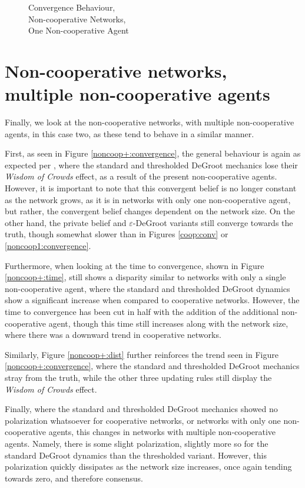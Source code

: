 \documentclass[a4paper, 12pt]{report}
\begin{document}
\begin{figure}[!htbp]
    \caption{Convergence Behaviour, \\ Non-cooperative Networks, \\ One Non-cooperative Agent}
\end{figure}

\newpage

\section{Non-cooperative networks, \\ multiple non-cooperative agents}
\label{results:noncoop+}
Finally, we look at the non-cooperative networks, with multiple non-cooperative agents, in this case two, as these tend to behave in a similar manner.

First, as seen in Figure \ref{noncoop+:convergence}, the general behaviour is again as expected per \cite{amir2021robust}, where the standard and thresholded DeGroot mechanics lose their \emph{Wisdom of Crowds} effect, as a result of the present non-cooperative agents. However, it is important to note that this convergent belief is no longer constant as the network grows, as it is in networks with only one non-cooperative agent, but rather, the convergent belief changes dependent on the network size. On the other hand, the private belief and $\varepsilon$-DeGroot variants still converge towards the truth, though somewhat slower than in Figures \ref{coop:conv} or \ref{noncoop1:convergence}.

Furthermore, when looking at the time to convergence, shown in Figure \ref{noncoop+:time}, still shows a disparity similar to networks with only a single non-cooperative agent, where the standard and thresholded DeGroot dynamics show a significant increase when compared to cooperative networks. However, the time to convergence has been cut in half with the addition of the additional non-cooperative agent, though this time still increases along with the network size, where there was a downward trend in cooperative networks.

Similarly, Figure \ref{noncoop+:dist} further reinforces the trend seen in Figure \ref{noncoop+:convergence}, where the standard and thresholded DeGroot mechanics stray from the truth, while the other three updating rules still display the \emph{Wisdom of Crowds} effect.

Finally, where the standard and thresholded DeGroot mechanics showed no polarization whatsoever for cooperative networks, or networks with only one non-cooperative agents, this changes in networks with multiple non-cooperative agents. Namely, there is some slight polarization, slightly more so for the standard DeGroot dynamics than the thresholded variant. However, this polarization quickly dissipates as the network size increases, once again tending towards zero, and therefore consensus. 
\end{document}

